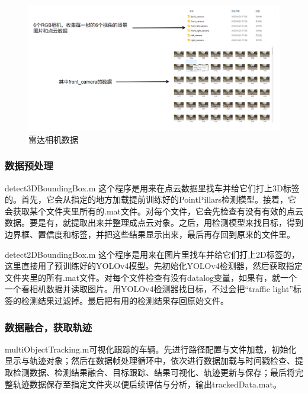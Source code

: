 \begin{figure}[htbp] %
	\centering
	\includegraphics[width=1\textwidth]{p12} %
	\caption{雷达相机数据} %
	\label{fig:p12} %
\end{figure}



\subsubsection{数据预处理}


detect3DBoundingBox.m 这个程序是用来在点云数据里找车并给它们打上3D标签的。首先，它会从指定的地方加载提前训练好的PointPillars检测模型。接着，它会获取某个文件夹里所有的.mat文件。对每个文件，它会先检查有没有有效的点云数据。要是有，就提取出来并整理成点云对象。之后，用检测模型来找目标，得到边界框、置信度和标签，并把这些结果显示出来，最后再存回到原来的文件里。

detect2DBoundingBox.m 这个程序是用来在图片里找车并给它们打上2D标签的，这里直接用了预训练好的YOLOv4模型。先初始化YOLOv4检测器，然后获取指定文件夹里的所有.mat文件。对每个文件检查有没有datalog变量，如果有，就一个一个看相机数据并读取图片。用YOLOv4检测器找目标，不过会把“traffic light”标签的检测结果过滤掉。最后把有用的检测结果存回原始文件。



\subsubsection{数据融合，获取轨迹}
multiObjectTracking.m可视化跟踪的车辆。先进行路径配置与文件加载，初始化显示与轨迹对象；然后在数据帧处理循环中，依次进行数据加载与时间戳检查、提取检测数据、检测结果融合、目标跟踪、结果可视化、轨迹更新与保存；最后将完整轨迹数据保存至指定文件夹以便后续评估与分析，输出trackedData.mat。
